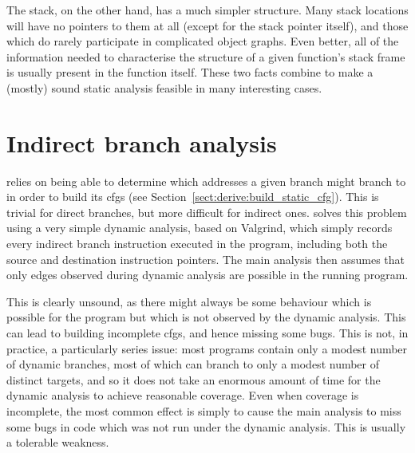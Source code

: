 The stack, on the other hand, has a much simpler structure.  Many
stack locations will have no pointers to them at all (except for the
stack pointer itself), and those which do rarely participate in
complicated object graphs.  Even better, all of the information needed
to characterise the structure of a given function's stack frame is
usually present in the function itself.  These two facts combine to
make a (mostly) sound static analysis feasible in many interesting
cases.


\section{Indirect branch analysis}
\label{sect:program_model:indirect_branches}


{\Technique} relies on being able to determine which addresses a given
branch might branch to in order to build its \glspl{cfg} (see
Section~\ref{sect:derive:build_static_cfg}).  This is trivial for
direct branches, but more difficult for indirect ones.
{\Implementation} solves this problem using a very simple dynamic
analysis, based on Valgrind\needCite{}, which simply records every
indirect branch instruction executed in the program, including both
the source and destination instruction pointers.  The main analysis
then assumes that only edges observed during dynamic analysis are
possible in the running program.

This is clearly unsound, as there might always be some behaviour which
is possible for the program but which is not observed by the dynamic
analysis.  This can lead to {\technique} building incomplete
\glspl{cfg}, and hence missing some bugs.  This is not, in practice, a
particularly series issue: most programs contain only a modest number
of dynamic branches, most of which can branch to only a modest number
of distinct targets, and so it does not take an enormous amount of
time for the dynamic analysis to achieve reasonable coverage.  Even
when coverage is incomplete, the most common effect is simply to cause
the main analysis to miss some bugs in code which was not run under
the dynamic analysis.  This is usually a tolerable weakness.

